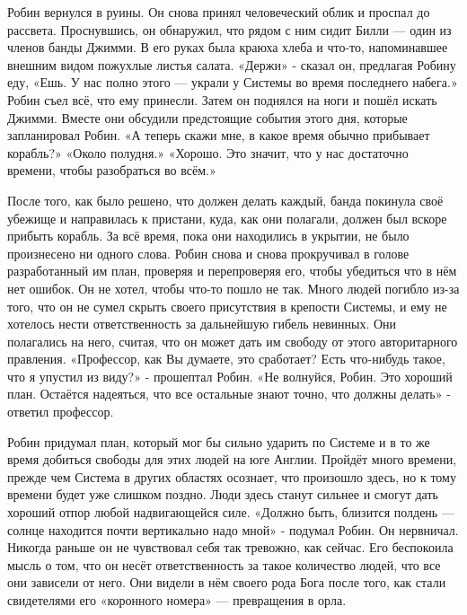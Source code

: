 \documentclass[a4paper,12pt]{book}
\begin{document}
	Робин вернулся в руины. Он снова принял человеческий облик и проспал до рассвета.
	Проснувшись, он обнаружил, что рядом с ним сидит Билли — один из членов банды Джимми. В его руках была краюха хлеба и что-то, напоминавшее внешним видом пожухлые листья салата.
	«Держи» - сказал он, предлагая Робину еду,
	«Ешь. У нас полно этого — украли у Системы во время последнего набега.»
	Робин съел всё, что ему принесли. Затем он поднялся на ноги и пошёл искать Джимми. Вместе они обсудили предстоящие события этого дня, которые запланировал Робин.
	«А теперь скажи мне, в какое время обычно прибывает корабль?»
	«Около полудня.»
	«Хорошо. Это значит, что у нас достаточно времени, чтобы разобраться во всём.»

	После того, как было решено, что должен делать каждый, банда покинула своё убежище и направилась к пристани, куда, как они полагали, должен был вскоре прибыть корабль.
	За всё время, пока они находились в укрытии, не было произнесено ни одного слова. Робин снова и снова прокручивал в голове разработанный им план, проверяя и перепроверяя его, чтобы убедиться что в нём нет ошибок. Он не хотел, чтобы что-то пошло не так. Много людей погибло из-за того, что он не сумел скрыть своего присутствия в крепости Системы, и ему не хотелось нести ответственность за дальнейшую гибель невинных. Они полагались на него, считая, что он может дать им свободу от этого авторитарного правления.
	«Профессор, как Вы думаете, это сработает? Есть что-нибудь такое, что я упустил из виду?» - прошептал Робин.
	«Не волнуйся, Робин. Это хороший план. Остаётся надеяться, что все остальные знают точно, что должны делать» - ответил профессор.

	Робин придумал план, который мог бы сильно ударить по Системе и в то же время добиться свободы для этих людей на юге Англии. Пройдёт много времени, прежде чем Система в других областях осознает, что произошло здесь, но к тому времени будет уже слишком поздно. Люди здесь станут сильнее и смогут дать хороший отпор любой надвигающейся силе.
	«Должно быть, близится полдень — солнце находится почти вертикально надо мной» - подумал Робин. Он нервничал. Никогда раньше он не чувствовал себя так тревожно, как сейчас. Его беспокоила мысль о том, что он несёт ответственность за такое количество людей, что все они зависели от него. Они видели в нём своего рода Бога после того, как стали свидетелями его «коронного номера» — превращения в орла.
\end{document}
